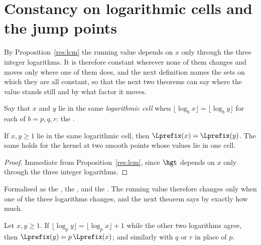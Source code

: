 
\section{Constancy on logarithmic cells and the jump points}\label{sec:cells}

By Proposition~\ref{res:lcm} the running value depends on $x$ only through the
three integer logarithms.  It is therefore constant wherever none of them
changes and moves only where one of them does, and the next definition names
the sets on which they are all constant, so that the next two theorems can say
where the value stands still and by what factor it moves.

Say that $x$ and $y$ lie in the same \emph{logarithmic cell} when
$\lfloor\log_b x\rfloor=\lfloor\log_b y\rfloor$ for each of $b=p,q,r$: the
.

\begin{theorem}\label{res:cell}
If $x,y\ge1$ lie in the same logarithmic cell, then
$\Lprefix(x)=\Lprefix(y)$.  The same holds for the kernel at two smooth points
whose values lie in one cell.
\end{theorem}

\begin{proof}
Immediate from Proposition~\ref{res:lcm}, since $\hgt$ depends on $x$ only
through the three integer logarithms.
\end{proof}

\noindent Formalised as the
, the
, and the
.  The running value therefore changes only when one of
the three logarithms changes, and the next theorem says by exactly how much.

\begin{theorem}\label{res:jump}
Let $x,y\ge1$.  If $\lfloor\log_p y\rfloor=\lfloor\log_p x\rfloor+1$ while the
other two logarithms agree, then $\Lprefix(y)=p\,\Lprefix(x)$; and similarly
with $q$ or $r$ in place of $p$.
\end{theorem}

